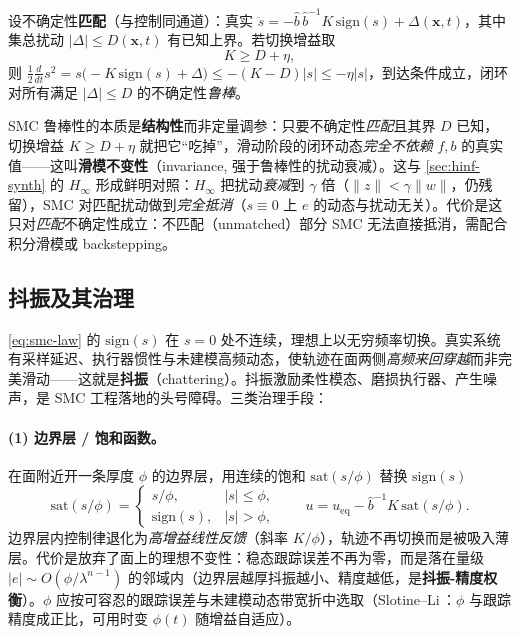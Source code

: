 \begin{theorem}[匹配不确定性下的鲁棒到达]
\label{thm:smc-robust}
设不确定性\textbf{匹配}（与控制同通道）：真实 $\ddot s=-\hat b\,\hat b^{-1}K\,\mathrm{sign}(s)+\Delta(\mathbf x,t)$，其中集总扰动 $|\Delta|\le D(\mathbf x,t)$ 有已知上界。若切换增益取
\begin{equation}
  K\ge D+\eta,
  \label{eq:smc-gain}
\end{equation}
则 $\tfrac12\frac{d}{dt}s^2=s\big(-K\,\mathrm{sign}(s)+\Delta\big)\le-(K-D)|s|\le-\eta|s|$，到达条件成立，闭环对所有满足 $|\Delta|\le D$ 的不确定性\emph{鲁棒}。
\end{theorem}

\begin{insight}
SMC 鲁棒性的本质是\textbf{结构性}而非定量调参：只要不确定性\emph{匹配}且其界 $D$ 已知，切换增益 $K\ge D+\eta$ 就把它“吃掉”，滑动阶段的闭环动态\emph{完全不依赖} $f,b$ 的真实值——这叫\textbf{滑模不变性}（invariance, 强于鲁棒性的扰动衰减）。这与 \cref{sec:hinf-synth} 的 $H_\infty$ 形成鲜明对照：$H_\infty$ 把扰动\emph{衰减}到 $\gamma$ 倍（$\|z\|<\gamma\|w\|$，仍残留），SMC 对匹配扰动做到\emph{完全抵消}（$s\equiv0$ 上 $e$ 的动态与扰动无关）。代价是这只对\emph{匹配}不确定性成立：不匹配（unmatched）部分 SMC 无法直接抵消，需配合积分滑模或 backstepping。
\end{insight}

\subsection{抖振及其治理}
\cref{eq:smc-law} 的 $\mathrm{sign}(s)$ 在 $s=0$ 处不连续，理想上以无穷频率切换。真实系统有采样延迟、执行器惯性与未建模高频动态，使轨迹在面两侧\emph{高频来回穿越}而非完美滑动——这就是\textbf{抖振}（chattering）。抖振激励柔性模态、磨损执行器、产生噪声，是 SMC 工程落地的头号障碍。三类治理手段：

\paragraph{(1) 边界层 / 饱和函数。}
在面附近开一条厚度 $\phi$ 的边界层，用连续的饱和 $\mathrm{sat}(s/\phi)$ 替换 $\mathrm{sign}(s)$
\begin{equation}
  \mathrm{sat}(s/\phi)=
  \begin{cases}
    s/\phi, & |s|\le\phi,\\
    \mathrm{sign}(s), & |s|>\phi,
  \end{cases}
  \qquad
  u=u_{\mathrm{eq}}-\hat b^{-1}K\,\mathrm{sat}(s/\phi).
  \label{eq:smc-sat}
\end{equation}
边界层内控制律退化为\emph{高增益线性反馈}（斜率 $K/\phi$），轨迹不再切换而是被吸入薄层。代价是放弃了面上的理想不变性：稳态跟踪误差不再为零，而是落在量级 $|e|\sim O(\phi/\lambda^{n-1})$ 的邻域内（边界层越厚抖振越小、精度越低，是\textbf{抖振-精度权衡}）。$\phi$ 应按可容忍的跟踪误差与未建模动态带宽折中选取（Slotine--Li\,\cite{slotine1991applied}：$\phi$ 与跟踪精度成正比，可用时变 $\phi(t)$ 随增益自适应）。

